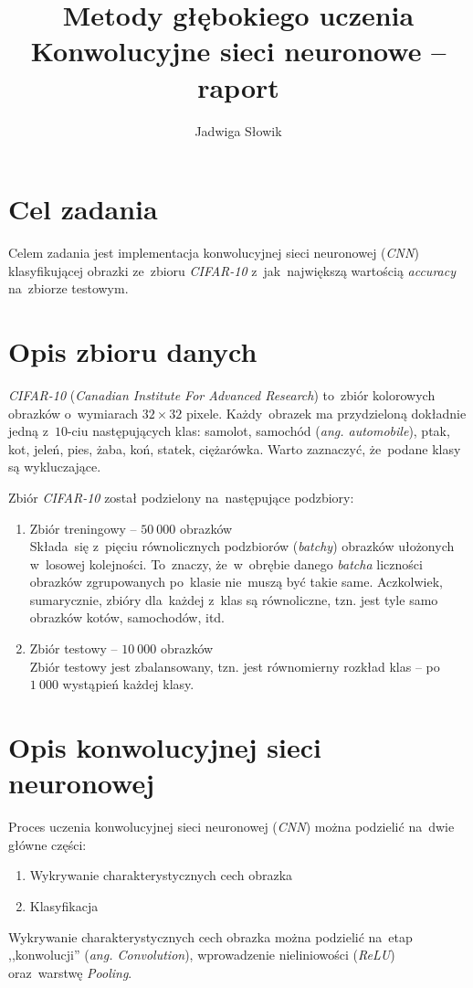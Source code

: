 \documentclass[11pt, a4paper]{article}
\title{Metody głębokiego uczenia \\
Konwolucyjne sieci neuronowe -- raport}
\author{Jadwiga Słowik}
\begin{document}
\maketitle
\section{Cel zadania}
Celem zadania jest implementacja konwolucyjnej sieci neuronowej (\textit{CNN}) klasyfikującej obrazki
ze~zbioru \textit{CIFAR-10} z~jak~największą wartością \textit{accuracy} na~zbiorze testowym.

\section{Opis zbioru danych}
\textit{CIFAR-10} (\textit{Canadian Institute For Advanced Research}) to~zbiór kolorowych obrazków o~wymiarach $32 \times 32$ pixele. Każdy~obrazek ma przydzieloną dokładnie jedną z~$10$-ciu następujących klas: samolot, samochód (\textit{ang. automobile}), ptak, kot, jeleń, pies, żaba, koń, statek, ciężarówka. Warto zaznaczyć, że~podane klasy są wykluczające.

Zbiór \textit{CIFAR-10} został podzielony na~następujące podzbiory:
\begin{enumerate}
    \item Zbiór treningowy -- $50\:000$ obrazków \\
    Składa~się z~pięciu równolicznych podzbiorów (\textit{batchy}) obrazków ułożonych w~losowej kolejności. To~znaczy, że~w~obrębie danego \textit{batcha} liczności obrazków zgrupowanych po~klasie nie~muszą być takie same.
    Aczkolwiek, sumarycznie, zbióry dla~każdej z~klas są równoliczne, tzn. jest tyle samo obrazków kotów, samochodów, itd.
    \item Zbiór testowy -- $10\:000$ obrazków \\
    Zbiór testowy jest zbalansowany, tzn. jest równomierny rozkład klas -- po~$1\:000$ wystąpień każdej klasy.
\end{enumerate}

\section{Opis konwolucyjnej sieci neuronowej}
Proces uczenia konwolucyjnej sieci neuronowej (\textit{CNN}) można podzielić na~dwie główne części: 
\begin{enumerate}
    \item Wykrywanie charakterystycznych cech obrazka
    \item Klasyfikacja
\end{enumerate}
Wykrywanie charakterystycznych cech obrazka można podzielić na~etap ,,konwolucji'' (\textit{ang. Convolution}), wprowadzenie nieliniowości (\textit{ReLU}) oraz~warstwę \textit{Pooling}.
\end{document}
